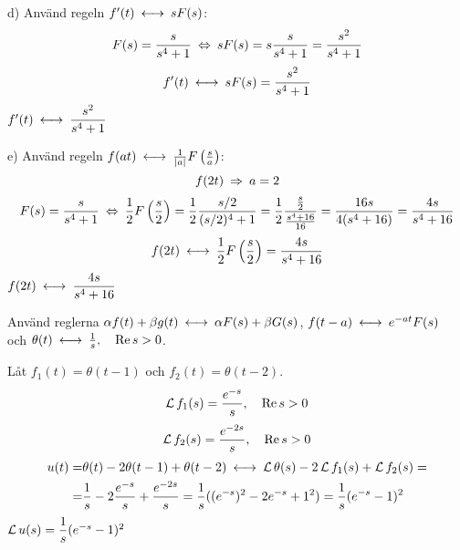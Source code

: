 \begin{task}{d)}
	Använd regeln $f'(t) \llra sF(s)$:
	\begin{align*}
	F(s)=
	\frac{s}{s^4+1} \lra 
	sF(s)=
	s\frac{s}{s^4+1}=
	\frac{s^2}{s^4+1}
	\end{align*}
	\[f'(t) \llra sF(s)=\frac{s^2}{s^4+1}\]
	\ans $f'(t) \llra \dfrac{s^2}{s^4+1}$
\end{task}

\begin{task}{e)}
	Använd regeln $f(at) \llra \frac{1}{\abs{a}}F\left(\frac{s}{a}\right)$:
	\[f(2t) \ra a=2\]
	\begin{align*}
	F(s)=
	\frac{s}{s^4+1} \lra 
	\frac{1}{2}F\left(\frac{s}{2}\right)=
	\frac{1}{2}\frac{s/2}{(s/2)^4+1}=
	\frac{1}{2}\frac{\frac{s}{2}}{\frac{s^4+16}{16}}=
	\frac{16s}{4(s^4+16)}=
	\frac{4s}{s^4+16}
	\end{align*}
	\[f(2t) \llra \frac{1}{2}F\left(\frac{s}{2}\right)=\frac{4s}{s^4+16}\]
	\ans $f(2t) \llra \dfrac{4s}{s^4+16}$
\end{task}

\begin{task}{3.5}
	Använd reglerna $\alpha f(t)+\beta g(t) \llra \alpha F(s)+\beta G(s)$, $f(t-a) \llra e^{-at}F(s)$ \\
	och $\theta(t)\llra \frac{1}{s}\cond{\Re s > 0}$.
	
	Låt $f_1(t)=\theta(t-1)$ och $f_2(t)=\theta(t-2)$.
	\[\operatorname{\mathcal{L}} f_1(s) = \frac{e^{-s}}{s}, \quad \operatorname{Re} s > 0\]
	\[\operatorname{\mathcal{L}} f_2(s) = \frac{e^{-2s}}{s}, \quad \operatorname{Re} s > 0\]
	\begin{align*}
	u(t)=
	&\theta(t)-2\theta(t-1)+\theta(t-2) \llra
	\laplace\theta(s)-2\laplace f_1(s)+\laplace f_2(s)= \\ =
	&\frac{1}{s}-2\frac{e^{-s}}{s}+\frac{e^{-2s}}{s}=
	\frac{1}{s}((e^{-s})^2-2e^{-s}+1^2)=
	\frac{1}{s}(e^{-s}-1)^2
	\end{align*}
	\ans $\operatorname{\mathcal{L}} u(s) = \dfrac{1}{s}(e^{-s}-1)^2$
\end{task}

